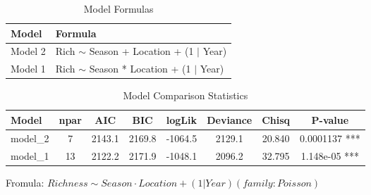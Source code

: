 \documentclass{article}
\date{February 2025}
\begin{document}
\begin{table}[h]
    \centering
    \begin{tabular}{ll}
        \hline
        \textbf{Model} & \textbf{Formula} \\
        \hline
        Model 2 & Rich $\sim$ {Season} + {Location} + (1 $\mid$ Year) \\
        Model 1 & Rich $\sim$ {Season} * {Location} + (1 $\mid$ Year) \\
        \hline
    \end{tabular}
    \caption{Model Formulas}
    \label{tab:models}
\end{table}

\begin{table}[h]
    \centering
    \begin{tabular}{lccccccc}
        \hline
        \textbf{Model} & \textbf{npar} & \textbf{AIC} & \textbf{BIC} & \textbf{logLik} & \textbf{Deviance} & \textbf{Chisq} & \textbf{P-value} \\
        \hline
        model\_2 & 7 & 2143.1 & 2169.8 & -1064.5 & 2129.1 & 20.840 & 0.0001137 *** \\
        model\_1 & 13 & 2122.2 & 2171.9 & -1048.1 & 2096.2 & 32.795 & 1.148e-05 *** \\
        \hline
    \end{tabular}
    \caption{Model Comparison Statistics}
    \label{tab:model_comparison}
\end{table}


Fromula:
$Richness \sim Season \cdot Location + (1 | Year) (family \colon Poisson)$
\end{document}
